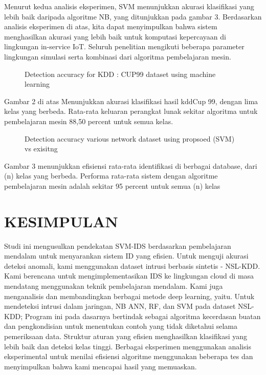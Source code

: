 \documentclass[conference]{IEEEtran}
\begin{document}
Menurut kedua analisis eksperimen, SVM menunjukkan akurasi klasifikasi yang lebih baik daripada algoritme NB, yang ditunjukkan pada gambar 3. Berdasarkan analisis eksperimen di atas, kita dapat menyimpulkan bahwa sistem menghasilkan akurasi yang lebih baik untuk komputasi kepercayaan di lingkungan in-service IoT. Seluruh penelitian mengikuti beberapa parameter lingkungan simulasi serta kombinasi dari algoritma pembelajaran mesin.

\begin{figure}[h]
\centering
\scalebox{0.35}{}
\caption{Detection accuracy for KDD : CUP99 dataset using machine learning}
\end{figure}

Gambar 2 di atas Menunjukkan akurasi klasifikasi hasil kddCup 99, dengan lima kelas yang berbeda. Rata-rata keluaran perangkat lunak sekitar algoritma untuk pembelajaran mesin 88,50 percent untuk semua kelas.

\begin{figure}[h]
\centering
\scalebox{0.35}{}
\caption{Detection accuracy various network dataset using propsoed (SVM) vs exisitng}
\end{figure}

Gambar 3 menunjukkan efisiensi rata-rata identifikasi di berbagai database, dari (n) kelas yang berbeda. Performa rata-rata sistem dengan algoritme pembelajaran mesin adalah sekitar 95 percent untuk semua (n) kelas

\section{KESIMPULAN}

Studi ini mengusulkan pendekatan SVM-IDS berdasarkan pembelajaran mendalam untuk menyarankan sistem ID yang efisien. Untuk menguji akurasi deteksi anomali, kami menggunakan dataset intrusi berbasis sintetis - NSL-KDD. Kami berencana untuk mengimplementasikan IDS ke lingkungan cloud di masa mendatang menggunakan teknik pembelajaran mendalam. Kami juga menganalisis dan membandingkan berbagai metode deep learning, yaitu. Untuk mendeteksi intrusi dalam jaringan, NB ANN, RF, dan SVM pada dataset NSL-KDD; Program ini pada dasarnya bertindak sebagai algoritma kecerdasan buatan dan pengkondisian untuk menentukan contoh yang tidak diketahui selama pemeriksaan data. Struktur aturan yang efisien menghasilkan klasifikasi yang lebih baik dan deteksi kelas tinggi. Berbagai eksperimen menggunakan analisis eksperimental untuk menilai efisiensi algoritme menggunakan beberapa tes dan menyimpulkan bahwa kami mencapai hasil yang memuaskan.




\end{document}
